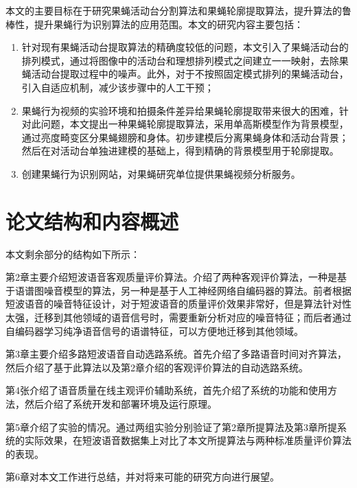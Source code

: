 本文的主要目标在于研究果蝇活动台分割算法和果蝇轮廓提取算法，提升算法的鲁棒性，提升果蝇行为识别算法的应用范围。本文的研究内容主要包括：
\begin{enumerate}
\item 针对现有果蝇活动台提取算法的精确度较低的问题，本文引入了果蝇活动台的排列模式，通过将图像中的活动台和理想排列模式之间建立一一映射，去除果蝇活动台提取过程中的噪声。此外，对于不按照固定模式排列的果蝇活动台，引入自适应机制，减少该步骤中的人工干预；
\item 果蝇行为视频的实验环境和拍摄条件差异给果蝇轮廓提取带来很大的困难，针对此问题，本文提出一种果蝇轮廓提取算法，采用单高斯模型作为背景模型，通过亮度畸变区分果蝇翅膀和身体。初步建模后分离果蝇身体和活动台背景；然后在对活动台单独进建模的基础上，得到精确的背景模型用于轮廓提取。
\item 创建果蝇行为识别网站，对果蝇研究单位提供果蝇视频分析服务。
\end{enumerate}

\section{论文结构和内容概述}

本文剩余部分的结构如下所示：

第2章主要介绍短波语音客观质量评价算法。介绍了两种客观评价算法，一种是基于语谱图噪音模型的算法，另一种是基于人工神经网络自编码器的算法。前者根据短波语音的噪音特征设计，对于短波语音的质量评价效果非常好，但是算法针对性太强，迁移到其他领域的语音信号时，需要重新分析对应的噪音特征；而后者通过自编码器学习纯净语音信号的语谱特征，可以方便地迁移到其他领域。

第3章主要介绍多路短波语音自动选路系统。首先介绍了多路语音时间对齐算法，然后介绍了基于此算法以及第2章介绍的客观评价算法的自动选路系统。

第4张介绍了语音质量在线主观评价辅助系统，首先介绍了系统的功能和使用方法，然后介绍了系统开发和部署环境及运行原理。

第5章介绍了实验的情况。通过两组实验分别验证了第2章所提算法及第3章所提系统的实际效果，在短波语音数据集上对比了本文所提算法与两种标准质量评价算法的表现。

第6章对本文工作进行总结，并对将来可能的研究方向进行展望。

